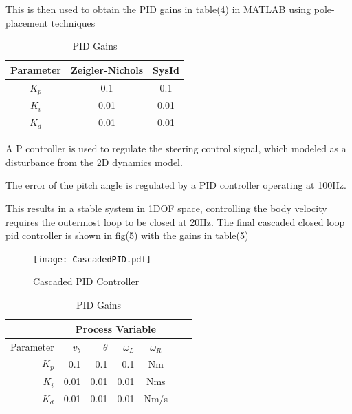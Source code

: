         This is then used to obtain the PID gains in table(4) in MATLAB using pole-placement techniques
        \begin{table}[H]
            \centering
            \begin{tabular}{|c|c|c|}
                \hline
                Parameter & Zeigler-Nichols & SysId \\
                \hline 
                $K_p$ & 0.1 & 0.1 \\
                $K_i$ & 0.01 & 0.01 \\
                $K_d$ & 0.01 & 0.01 \\
                \hline
            \end{tabular}
            \caption{PID Gains}
        \end{table}

        A P controller is used to regulate the steering control signal, which modeled
        as a disturbance from the 2D dynamics model.

        The error of the pitch angle is regulated by a PID controller operating at 100Hz. 
        
        This results in a stable system in 1DOF space, controlling the body velocity requires the outermost loop to be closed at 20Hz.
        The final cascaded closed loop pid controller is shown in fig(5) with the gains in table(5)

        \begin{figure}[H]
            \texttt{[image: CascadedPID.pdf]}
            \caption{Cascaded PID Controller}
        \end{figure}

        \begin{table}[H]
            \centering
            \begin{tabular}{|r|r|r|r|c|c|c}
                \hline
                & \multicolumn{4}{c|}{Process Variable}  \\
                \hline
                Parameter & $v_b$ & $\theta$  & $\omega_L$ & $\omega_R$ \\
                \hline      
                $K_p$ & 0.1 & 0.1 & 0.1 & Nm \\
                $K_i$ & 0.01 & 0.01 & 0.01 & Nms \\
                $K_d$ & 0.01 & 0.01 & 0.01 & Nm/s \\
                \hline
            \end{tabular}
            \caption{PID Gains}
        \end{table}
        \pagebreak{}
